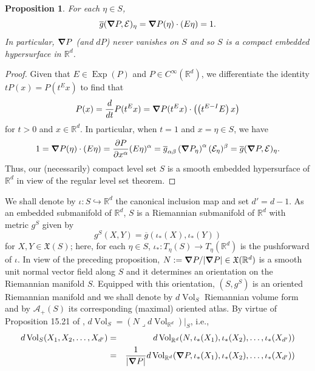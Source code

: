 \documentclass[11pt]{article}
\newtheorem{proposition}[theorem]{Proposition}
\newcommand\Exp{\operatorname{Exp}}
\newcommand{\Vol}{\operatorname{Vol}}
\newcommand{\iprod}{\mathbin{\lrcorner}}
\begin{document}
\begin{proposition}\label{prop:InnerProdIsOne}
For each $\eta\in S$, 
\begin{equation*}
    \overline{g}(\grad P,\mathcal{E})_{\eta}=\grad P(\eta)\cdot (E\eta)=1.
\end{equation*}
In particular, $\grad P$ (and $dP$) never vanishes on $S$ and so $S$ is a compact embedded hypersurface in $\mathbb{R}^d$.
\end{proposition}
\begin{proof}
Given that $E\in\Exp(P)$ and $P\in C^\infty(\mathbb{R}^d)$, we differentiate the identity $tP(x)=P(t^Ex)$ to find that
\begin{equation*}
    P(x)=\frac{d}{dt}P(t^Ex)=\grad P(t^Ex)\cdot\left(\left(t^{E-I}E\right)x\right)
\end{equation*}
for $t>0$ and $x\in\mathbb{R}^d$. In particular, when $t=1$ and $x=\eta\in S$, we have
\begin{equation*}
    1=\grad P(\eta)\cdot \left(E\eta\right)=\frac{\partial P}{\partial x^\alpha}(E\eta)^\alpha=\overline{g}_{\alpha \beta}\left(\grad P_\eta\right)^{\alpha}(\mathcal{E}_\eta)^\beta=\overline{g}(\grad P,\mathcal{E})_\eta.
\end{equation*}
Thus, our (necessarily) compact level set $S$ is a smooth embedded hypersurface of $\mathbb{R}^d$ in view of the regular level set theorem.
\end{proof}
\noindent We shall denote by $\iota:  S \hookrightarrow \mathbb{R}^d$ the canonical inclusion map and set $d'=d-1$. As an embedded submanifold of $\mathbb{R}^d$, $S$ is a Riemannian submanifold of $\mathbb{R}^d$ with metric $g^S$ given by
\begin{equation*}
    g^S(X,Y)=\overline{g}(\iota_*(X),\iota_*(Y))
\end{equation*}
for $X,Y\in\mathfrak{X}(S)$; here, for each $\eta\in S$,  $\iota_*:T_\eta(S)\to T_\eta(\mathbb{R}^d)$ is the pushforward of $\iota$.  In view of the preceding proposition, $N:=\grad P/|\grad P|\in \mathfrak{X}(\mathbb{R}^d)$ is a smooth unit normal vector field along $S$ and it determines an orientation on the Riemannian manifold $S$. Equipped with this orientation, $(S,g^S)$ is an oriented Riemannian manifold and we shall denote by $d\Vol_S$ Riemannian volume form and by $\mathcal{A}_+(S)$ its corresponding (maximal) oriented atlas. By virtue of Proposition 15.21 of \cite{lee2013smooth}, $d\Vol_S=(N\iprod d\Vol_{\mathbb{R}^d})\vert_S$, i.e.,
\begin{eqnarray*}
    d\Vol_S(X_1,X_2,\dots,X_{d'})&=&d\Vol_{\mathbb{R}^d}(N,\iota_*(X_1),\iota_*(X_2),\dots,\iota_*(X_{d'}))\\
    &=&\frac{1}{|\grad P|}d\Vol_{\mathbb{R}^d}(\grad P,\iota_*(X_1),\iota_*(X_2),\dots,\iota_*(X_{d'}))
\end{eqnarray*}
\end{document}
